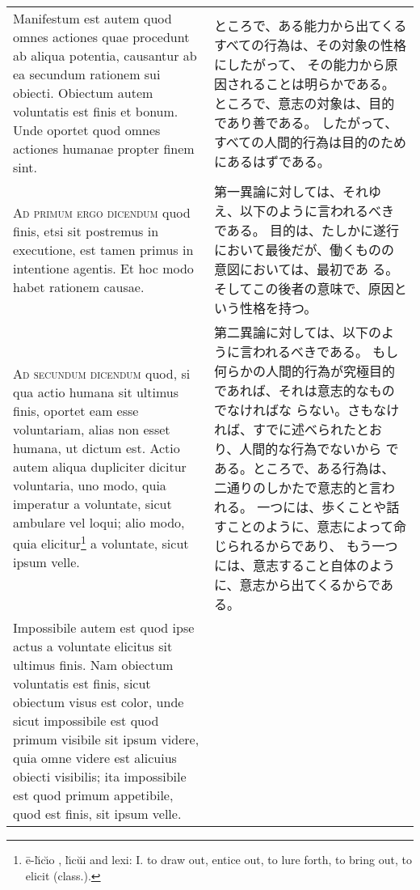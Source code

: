 \documentclass[10pt]{jsarticle} %
\begin{document}
\begin{longtable}{p{21em}p{21em}}
\\

Manifestum est autem quod omnes actiones quae
procedunt ab aliqua potentia, causantur ab ea secundum rationem sui
obiecti. Obiectum autem voluntatis est finis et bonum. Unde oportet quod
omnes actiones humanae propter finem sint.

&

ところで、ある能力から出てくるすべての行為は、その対象の性格にしたがって、
 その能力から原因されることは明らかである。
ところで、意志の対象は、目的であり善である。
したがって、すべての人間的行為は目的のためにあるはずである。


\\



{\scshape Ad primum ergo dicendum} quod finis, etsi
sit postremus in executione, est tamen primus in intentione agentis. Et
hoc modo habet rationem causae.

&



第一異論に対しては、それゆえ、以下のように言われるべきである。
目的は、たしかに遂行において最後だが、働くものの意図においては、最初であ
 る。そしてこの後者の意味で、原因という性格を持つ。


\\



{\scshape Ad secundum dicendum} quod, si qua actio
humana sit ultimus finis, oportet eam esse voluntariam, alias non esset
humana, ut dictum est. Actio autem aliqua dupliciter dicitur voluntaria,
uno modo, quia imperatur a voluntate, sicut ambulare vel loqui; alio
modo, quia elicitur\footnote{\={e}-l\u{\i}c\u{\i}o , l\u{\i}c\u{u}i and lexi:
I. to draw out, entice out, to lure forth, to bring out, to elicit (class.). } a voluntate, sicut ipsum velle. 


&

第二異論に対しては、以下のように言われるべきである。
もし何らかの人間的行為が究極目的であれば、それは意志的なものでなければな
 らない。さもなければ、すでに述べられたとおり、人間的な行為でないから
 である。ところで、ある行為は、二通りのしかたで意志的と言われる。
一つには、歩くことや話すことのように、意志によって命じられるからであり、
 もう一つには、意志すること自体のように、意志から出てくるからであ
 る。


\\

Impossibile autem
est quod ipse actus a voluntate elicitus sit ultimus finis. Nam obiectum
voluntatis est finis, sicut obiectum visus est color, unde sicut
impossibile est quod primum visibile sit ipsum videre, quia omne videre
est alicuius obiecti visibilis; ita impossibile est quod primum
appetibile, quod est finis, sit ipsum velle. 




\end{longtable}
\end{document}
